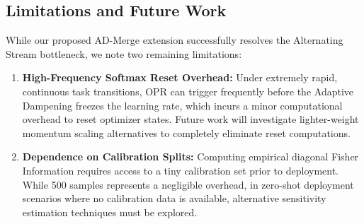 \documentclass{article}
\theoremstyle{plain}
\theoremstyle{definition}
\theoremstyle{remark}
\begin{document}
\begin{table}[ht]
\caption{Ablation of damping exponent $\alpha$ on the Sequential stream.}
\label{tab:alpha_sweep}
\vskip 0.15in
\begin{center}
\begin{small}
\begin{sc}
\end{sc}
\end{small}
\nobreak
\end{center}
\vskip -0.1in
\end{table}

\subsection{Limitations and Future Work}
While our proposed AD-Merge extension successfully resolves the Alternating Stream bottleneck, we note two remaining limitations:
\begin{enumerate}
    \item \textbf{High-Frequency Softmax Reset Overhead:} Under extremely rapid, continuous task transitions, OPR can trigger frequently before the Adaptive Dampening freezes the learning rate, which incurs a minor computational overhead to reset optimizer states. Future work will investigate lighter-weight momentum scaling alternatives to completely eliminate reset computations.
    \item \textbf{Dependence on Calibration Splits:} Computing empirical diagonal Fisher Information requires access to a tiny calibration set prior to deployment. While 500 samples represents a negligible overhead, in zero-shot deployment scenarios where no calibration data is available, alternative sensitivity estimation techniques must be explored.
\end{enumerate}
\end{document}
